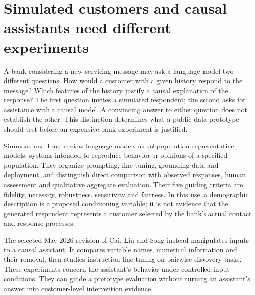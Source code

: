 \section{Simulated customers and causal assistants need different experiments}
\label{exec20:pa-scope}

A bank considering a new servicing message may ask a language model two
different questions. How would a customer with a given history respond to the
message? Which features of the history justify a causal explanation of the
response? The first question invites a simulated respondent; the second asks
for assistance with a causal model. A convincing answer to either question
does not establish the other. This distinction determines what a public-data
prototype should test before an expensive bank experiment is justified.

Simmons and Hare review language models as subpopulation representative
models: systems intended to reproduce behavior or opinions of a specified
population. They organize prompting, fine-tuning, grounding data and deployment,
and distinguish direct comparison with observed responses, human assessment
and qualitative aggregate evaluation. Their five guiding criteria are fidelity,
necessity, robustness, sensitivity and fairness. In this use, a demographic
description is a proposed conditioning variable; it is not evidence that the
generated respondent represents a customer selected by the bank's actual
contact and response processes.~\citep{exec20_population}

The selected May 2026 revision of Cai, Liu and Song instead manipulates inputs
to a causal assistant. It compares variable names, numerical information and
their removal, then studies instruction fine-tuning on pairwise discovery
tasks. These experiments concern the assistant's behavior under controlled
input conditions. They can guide a prototype evaluation without turning an
assistant's answer into customer-level intervention evidence.
\citep{exec20_attribution}

